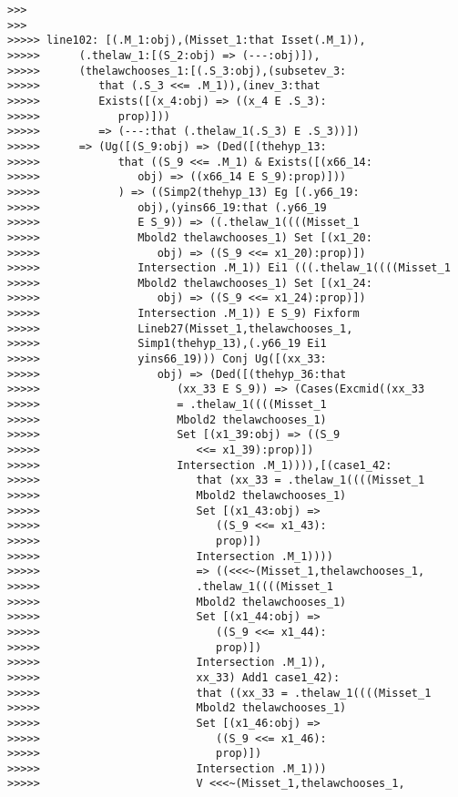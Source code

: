 \documentclass[12pt]{article}
\begin{document}
\begin{verbatim}
>>>
>>>
>>>>> line102: [(.M_1:obj),(Misset_1:that Isset(.M_1)),
>>>>>      (.thelaw_1:[(S_2:obj) => (---:obj)]),
>>>>>      (thelawchooses_1:[(.S_3:obj),(subsetev_3:
>>>>>         that (.S_3 <<= .M_1)),(inev_3:that
>>>>>         Exists([(x_4:obj) => ((x_4 E .S_3):
>>>>>            prop)]))
>>>>>         => (---:that (.thelaw_1(.S_3) E .S_3))])
>>>>>      => (Ug([(S_9:obj) => (Ded([(thehyp_13:
>>>>>            that ((S_9 <<= .M_1) & Exists([(x66_14:
>>>>>               obj) => ((x66_14 E S_9):prop)]))
>>>>>            ) => ((Simp2(thehyp_13) Eg [(.y66_19:
>>>>>               obj),(yins66_19:that (.y66_19
>>>>>               E S_9)) => ((.thelaw_1((((Misset_1
>>>>>               Mbold2 thelawchooses_1) Set [(x1_20:
>>>>>                  obj) => ((S_9 <<= x1_20):prop)])
>>>>>               Intersection .M_1)) Ei1 (((.thelaw_1((((Misset_1
>>>>>               Mbold2 thelawchooses_1) Set [(x1_24:
>>>>>                  obj) => ((S_9 <<= x1_24):prop)])
>>>>>               Intersection .M_1)) E S_9) Fixform
>>>>>               Lineb27(Misset_1,thelawchooses_1,
>>>>>               Simp1(thehyp_13),(.y66_19 Ei1
>>>>>               yins66_19))) Conj Ug([(xx_33:
>>>>>                  obj) => (Ded([(thehyp_36:that
>>>>>                     (xx_33 E S_9)) => (Cases(Excmid((xx_33
>>>>>                     = .thelaw_1((((Misset_1
>>>>>                     Mbold2 thelawchooses_1)
>>>>>                     Set [(x1_39:obj) => ((S_9
>>>>>                        <<= x1_39):prop)])
>>>>>                     Intersection .M_1)))),[(case1_42:
>>>>>                        that (xx_33 = .thelaw_1((((Misset_1
>>>>>                        Mbold2 thelawchooses_1)
>>>>>                        Set [(x1_43:obj) =>
>>>>>                           ((S_9 <<= x1_43):
>>>>>                           prop)])
>>>>>                        Intersection .M_1))))
>>>>>                        => ((<<<~(Misset_1,thelawchooses_1,
>>>>>                        .thelaw_1((((Misset_1
>>>>>                        Mbold2 thelawchooses_1)
>>>>>                        Set [(x1_44:obj) =>
>>>>>                           ((S_9 <<= x1_44):
>>>>>                           prop)])
>>>>>                        Intersection .M_1)),
>>>>>                        xx_33) Add1 case1_42):
>>>>>                        that ((xx_33 = .thelaw_1((((Misset_1
>>>>>                        Mbold2 thelawchooses_1)
>>>>>                        Set [(x1_46:obj) =>
>>>>>                           ((S_9 <<= x1_46):
>>>>>                           prop)])
>>>>>                        Intersection .M_1)))
>>>>>                        V <<<~(Misset_1,thelawchooses_1,

\end{verbatim}
\end{document}
